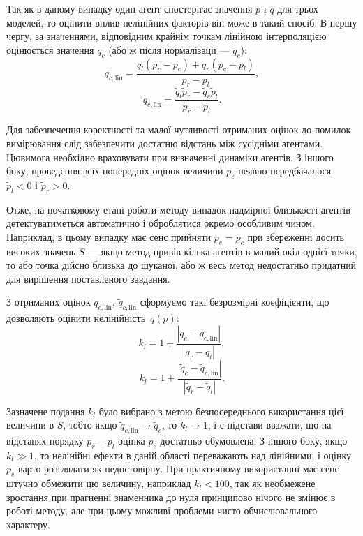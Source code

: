 Так як в даному випадку один агент спостерігає значення
$p$ і
$q$ для трьох моделей, то оцінити вплив нелінійних факторів він
може в такий спосіб. В першу чергу, за значеннями, відповідним
крайнім точкам лінійною інтерполяцією оцінюється значення
$q_c$ (або ж після нормалізації ---
$ \tilde{q}_c $):
%
\begin{equation}
 q_{c,\mathrm{lin}}
  =
  \frac{  q_l \left( p_r - p_c \right) + q_r \left( p_c - p_l \right) }{p_r-p_l},
  \label{atu:eq:q_clin}
\end{equation}
%
\begin{equation}
  \tilde{q}_{c,\mathrm{lin}}
  =
  \frac{ \tilde{q}_l \tilde{p}_r - \tilde{q}_r \tilde{p}_l }{\tilde{p}_r-\tilde{p}_l}  .
  \label{atu:eq:qr_clin}
\end{equation}

Для забезпечення коректності та малої чутливості отриманих
оцінок до помилок вимірювання слід забезпечити достатню
відстань між сусідніми агентами. Цювимога необхідно
враховувати при визначенні динаміки агентів. З іншого боку,
проведення всіх попередніх оцінок величини
$ p_e $ неявно передбачалося
$ \tilde{p}_l <0 $ і
$ \tilde{p}_r> 0 $.

Отже, на початковому етапі роботи методу випадок надмірної
близькості агентів детектуватиметься автоматично і оброблятися
окремо особливим чином. Наприклад, в цьому випадку має сенс
прийняти
$ p_e = p_c $ при збереженні досить високих значень
$ S $ --- якщо метод привів кілька агентів в малий окіл однієї
точки, то або точка дійсно близька до шуканої, або ж весь метод
недостатньо придатний для вирішення поставленого завдання.


З отриманих оцінок
$ q_{c, \mathrm{lin}} $,
$ \tilde{q}_{c, \mathrm{lin}} $
сформуємо такі безрозмірні коефіцієнти, що
дозволяють оцінити нелінійність~$q(p)$:
%
\begin{equation}
  k_l = 1 + \frac{|q_c - q_{c,\mathrm{lin}}|}{|q_r-q_l|} ,
  \label{atu:eq:k_l1}
\end{equation}
%
\begin{equation}
  k_l = 1 + \frac{|\tilde{q}_c - \tilde{q}_{c,\mathrm{lin}}|}{ |\tilde{q}_r-\tilde{q}_l|} .
  \label{atu:eq:k_l2}
\end{equation}

Зазначене подання
$ k_l $ було вибрано з метою безпосереднього використання цієї
величини в
$ S $, тобто якщо
$ \tilde{q}_{c, \mathrm{lin}} \to \tilde{q}_c $, то
$ k_l \to 1 $, і є підстави вважати, що на відстанях порядку
$ p_r-p_l $ оцінка
$ p_e $ достатньо обумовлена. З іншого боку, якщо
$ k_l \gg 1 $, то нелінійні ефекти в даній області переважають над
лінійними, і оцінку
$p_e$ варто розглядати як недостовірну. При практичному
використанні має сенс штучно обмежити цю величину, наприклад
$ k_l <100 $, так як необмежене зростання при прагненні знаменника
до нуля принципово нічого не змінює в роботі методу, але при
цьому можливі проблеми чисто обчислювального характеру.



